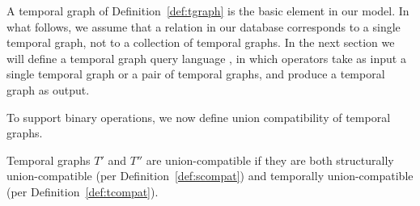 A  temporal graph of Definition~\ref{def:tgraph} is the basic
element in our model.  In what follows, we assume that a relation in
our database corresponds to a single temporal graph, not to a
collection of temporal graphs.  In the next section we will define a
temporal graph query language \ql, in which operators take as input a
single temporal graph or a pair of temporal graphs, and produce a
temporal graph as output.

To support binary operations, we now define union compatibility of
temporal graphs.

\begin{definition} 
\label{def:tuc} Temporal graphs $T'$ and $T''$ are union-compatible if they are both
structurally union-compatible (per Definition~\ref{def:scompat}) and
temporally union-compatible (per Definition~\ref{def:tcompat}).
\end{definition}




